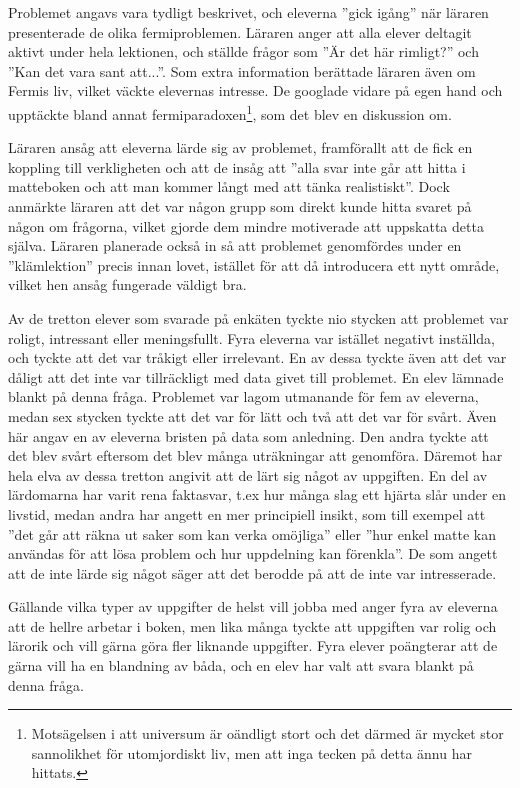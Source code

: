         \textcolor{lila}{Problemet angavs vara tydligt beskrivet, och eleverna ''gick igång'' när läraren presenterade de olika fermiproblemen. Läraren anger att alla elever deltagit aktivt under hela lektionen, och ställde frågor som ''Är det här rimligt?'' och ''Kan det vara sant att...''. Som extra information berättade läraren även om Fermis liv, vilket väckte elevernas intresse. De googlade vidare på egen hand och upptäckte bland annat fermiparadoxen\footnote{Motsägelsen i att universum är oändligt stort och det därmed är mycket stor sannolikhet för utomjordiskt liv, men att inga tecken på detta ännu har hittats.}, som det blev en diskussion om.}
        
        \textcolor{lila}{Läraren ansåg att eleverna lärde sig av problemet, framförallt att de fick en koppling till verkligheten och att de insåg att ''alla svar inte går att hitta i matteboken och att man kommer långt med att tänka realistiskt''. Dock anmärkte läraren att det var någon grupp som direkt kunde hitta svaret på någon om frågorna, vilket gjorde dem mindre motiverade att uppskatta detta själva. Läraren planerade också in så att problemet genomfördes under en ''klämlektion'' precis innan lovet, istället för att då introducera ett nytt område, vilket hen ansåg fungerade väldigt bra.}
        
        \textcolor{lila}{Av de tretton elever som svarade på enkäten tyckte nio stycken att problemet var roligt, intressant eller meningsfullt. Fyra eleverna var istället negativt inställda, och tyckte att det var tråkigt eller irrelevant. En av dessa tyckte även att det var dåligt att det inte var tillräckligt med data givet till problemet. En elev lämnade blankt på denna fråga. Problemet var lagom utmanande för fem av eleverna, medan sex stycken tyckte att det var för lätt och två att det var för svårt. Även här angav en av eleverna bristen på data som anledning. Den andra tyckte att det blev svårt eftersom det blev många uträkningar att genomföra. Däremot har hela elva av dessa tretton angivit att de lärt sig något av uppgiften. En del av lärdomarna har varit rena faktasvar, t.ex hur många slag ett hjärta slår under en livstid, medan andra har angett en mer principiell insikt, som till exempel att ''det går att räkna ut saker som kan verka omöjliga'' eller ''hur enkel matte kan användas för att lösa problem och hur uppdelning kan förenkla''. De som angett att de inte lärde sig något säger att det berodde på att de inte var intresserade.}
        
        \textcolor{lila}{Gällande vilka typer av uppgifter de helst vill jobba med anger fyra av eleverna att de hellre arbetar i boken, men lika många tyckte att uppgiften var rolig och lärorik och vill gärna göra fler liknande uppgifter. Fyra elever poängterar att de gärna vill ha en blandning av båda, och en elev har valt att svara blankt på denna fråga.}
        
